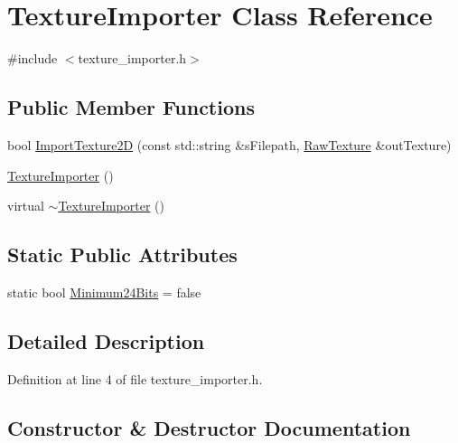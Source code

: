 \hypertarget{class_texture_importer}{}\section{Texture\+Importer Class Reference}
\label{class_texture_importer}


{\ttfamily \#include $<$texture\+\_\+importer.\+h$>$}

\subsection*{Public Member Functions}
\begin{DoxyCompactItemize}
\item 
bool \hyperlink{class_texture_importer_a8d10e2a976cf9434b4b341de8405f595}{Import\+Texture2\+D} (const std\+::string \&s\+Filepath, \hyperlink{class_raw_texture}{Raw\+Texture} \&out\+Texture)
\item 
\hyperlink{class_texture_importer_a01a672fb736e06ca9bd844bd8d4f1c9c}{Texture\+Importer} ()
\item 
virtual \hyperlink{class_texture_importer_affb52baf15cb65a31b5ca0c2b42b61bd}{$\sim$\+Texture\+Importer} ()
\end{DoxyCompactItemize}
\subsection*{Static Public Attributes}
\begin{DoxyCompactItemize}
\item 
static bool \hyperlink{class_texture_importer_a771ef6083f288138f236076f5fbc9ef7}{Minimum24\+Bits} = false
\end{DoxyCompactItemize}


\subsection{Detailed Description}


Definition at line 4 of file texture\+\_\+importer.\+h.



\subsection{Constructor \& Destructor Documentation}
\hypertarget{class_texture_importer_a01a672fb736e06ca9bd844bd8d4f1c9c}{}
